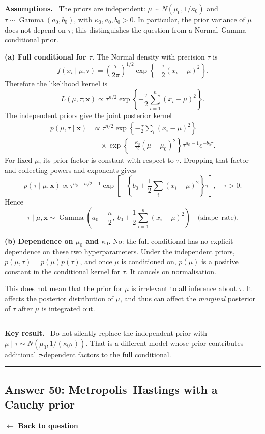 \documentclass[11pt,a4paper]{article}
\newcommand{\given}{\mathrel{|}}
\newcommand{\xvec}{\boldsymbol{x}}
\newcommand{\answernav}[1]{%
  \label{answer:#1}%
  \noindent\hyperref[question:#1]{$\leftarrow$ \textbf{Back to question}}%
  \par\smallskip}
\newcommand{\studyheading}[1]{%
  \par\medskip\noindent\textcolor{statblue}{\textbf{#1.}}\ }
\newenvironment{keyresult}
  {\begin{center}\begin{minipage}{0.92\linewidth}\color{statblue}%
   \hrule\vspace{6pt}\textbf{Key result.}\ }
  {\vspace{6pt}\hrule\end{minipage}\end{center}}
\begin{document}
\studyheading{Assumptions}
The priors are independent:
$\mu\sim N(\mu_0,1/\kappa_0)$ and $\tau\sim\operatorname{Gamma}(a_0,b_0)$,
with $\kappa_0,a_0,b_0>0$.
In particular, the prior variance of $\mu$ does not depend on $\tau$; this distinguishes the question from a Normal--Gamma conditional prior.

\textbf{(a) Full conditional for $\tau$.}
The Normal density with precision $\tau$ is
\[
f(x_i\given\mu,\tau)
=\left(\frac\tau{2\pi}\right)^{1/2}
\exp\left\{-\frac\tau2(x_i-\mu)^2\right\}.
\]
Therefore the likelihood kernel is
\[
L(\mu,\tau;\xvec)\propto
\tau^{n/2}\exp\left\{-\frac\tau2\sum_{i=1}^n(x_i-\mu)^2\right\}.
\]
The independent priors give the joint posterior kernel
\begin{align*}
p(\mu,\tau\given\xvec)
&\propto
\tau^{n/2}\exp\left\{-\frac\tau2\sum_i(x_i-\mu)^2\right\}\\
&\quad\times\exp\left\{-\frac{\kappa_0}{2}(\mu-\mu_0)^2\right\}
\tau^{a_0-1}e^{-b_0\tau}.
\end{align*}
For fixed $\mu$, its prior factor is constant with respect to $\tau$.
Dropping that factor and collecting powers and exponents gives
\[
\boxed{
p(\tau\given\mu,\xvec)\propto
\tau^{a_0+n/2-1}
\exp\left[-\left\{b_0+\frac12\sum_i(x_i-\mu)^2\right\}\tau\right],
\quad\tau>0.
}
\]
Hence
\[
\boxed{
\tau\given\mu,\xvec\sim\operatorname{Gamma}\!\left(
a_0+\frac n2,\ b_0+\frac12\sum_{i=1}^n(x_i-\mu)^2\right)
\quad\text{(shape--rate)}.
}
\]

\textbf{(b) Dependence on $\mu_0$ and $\kappa_0$.}
No: the full conditional has no explicit dependence on these two
hyperparameters. Under the independent priors,
$p(\mu,\tau)=p(\mu)p(\tau)$, and once $\mu$ is conditioned on,
$p(\mu)$ is a positive constant in the conditional kernel for $\tau$.
It cancels on normalisation.

This does not mean that the prior for $\mu$ is irrelevant to all inference
about $\tau$. It affects the posterior distribution of $\mu$, and thus
can affect the \emph{marginal} posterior of $\tau$ after $\mu$ is
integrated out.

\begin{keyresult}
Do not silently replace the independent prior with
$\mu\given\tau\sim N(\mu_0,1/(\kappa_0\tau))$.
That is a different model whose prior contributes additional
$\tau$-dependent factors to the full conditional.
\end{keyresult}

\clearpage

\subsection{Answer 50: Metropolis--Hastings with a Cauchy prior}
\answernav{50}
\end{document}
